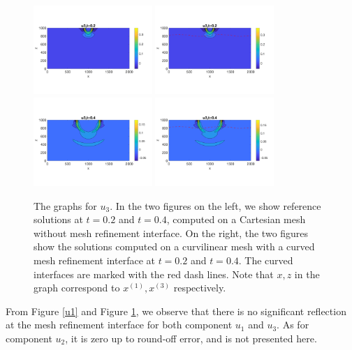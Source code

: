 
\begin{figure}[htbp]
	\centering
	\includegraphics[width=0.4\textwidth,trim={0 2.8cm 0 2.8cm}, clip]{u3_t02_cartesian.png}
	\includegraphics[width=0.4\textwidth,trim={0 2.8cm 0 2.8cm}, clip]{u3_t02_curvi_mr.png}\\
	\includegraphics[width=0.4\textwidth,trim={0 2.8cm 0 2.8cm}, clip]{u3_t04_cartesian.png}
	\includegraphics[width=0.4\textwidth,trim={0 2.8cm 0 2.8cm}, clip]{u3_t04_curvi_mr.png}
	\caption{The graphs for $u_3$. In the two figures on the left, we show reference solutions at $t=0.2$ and $t=0.4$, computed on a Cartesian mesh without mesh refinement interface. On the right, the two figures show the solutions computed on a curvilinear mesh with a curved mesh refinement interface at $t=0.2$ and $t=0.4$. The curved interfaces are marked with the red dash lines. Note that $x,z$ in the graph correspond to $x^{(1)}, x^{(3)}$ respectively.}
\label{u3}
\end{figure}
From Figure \ref{u1} and Figure \ref{u3}, we observe that there is no significant reflection at the mesh refinement interface for both component $u_1$ and $u_3$. As for component $u_2$, it is zero up to round-off error, and is not presented here.